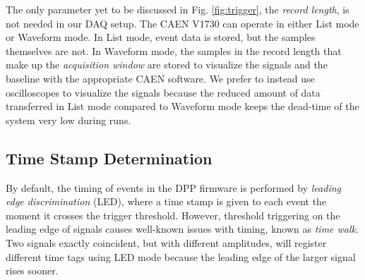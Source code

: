 The only parameter yet to be discussed in Fig. \ref{fig:trigger}, the \emph{record length}, is not needed in our DAQ setup. The CAEN V1730 can operate in either List mode or Waveform mode. In List mode, event data is stored, but the samples themselves are not. In Waveform mode, the samples in the record length that make up the \emph{acquisition window} are stored to visualize the signals and the baseline with the appropriate CAEN software. We prefer to instead use oscilloscopes to visualize the signals because the reduced amount of data transferred in List mode compared to Waveform mode keeps the dead-time of the system very low during runs.


\subsection{Time Stamp Determination} \label{subsec:time_stamp}


By default, the timing of events in the DPP firmware is performed by \emph{leading edge discrimination} (LED), where a time stamp is given to each event the moment it crosses the trigger threshold. However, threshold triggering on the leading edge of signals causes well-known issues with timing, known as \emph{time walk}. Two signals exactly coincident, but with different amplitudes, will register different time tags using LED mode because the leading edge of the larger signal rises sooner. 


